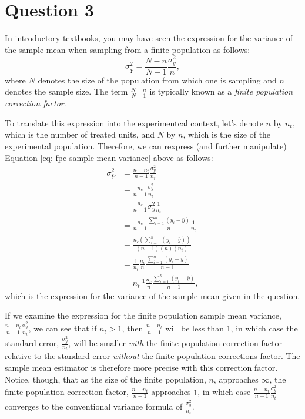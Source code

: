 \documentclass[
  12pt,
  leqno]{article}
\begin{document}
\section*{Question 3}

In introductory textbooks, you may have seen the expression for the
variance of the sample mean when sampling from a finite population as
follows: \begin{equation}
\sigma^2_{\overline{Y}} = \frac{N - n}{N - 1} \frac{\sigma^2_y}{n},
\label{eq: fpc sample mean variance}
\end{equation} where \(N\) denotes the size of the population from which
one is sampling and \(n\) denotes the sample size. The term
\(\frac{N - n}{N - 1}\) is typically known as a
\textit{finite population correction factor}.

To translate this expression into the experimentcal context, let's
denote \(n\) by \(n_t\), which is the number of treated units, and \(N\)
by \(n\), which is the size of the experimental population. Therefore,
we can rexpress (and further manipulate) Equation
\ref{eq: fpc sample mean variance} above as follows: \begin{align*}
\sigma^2_{\overline{Y}} & = \frac{n - n_t}{n - 1} \frac{\sigma^2_y}{n_t} \\
& = \frac{n_c}{n - 1} \frac{\sigma^2_y}{n_t} \\
& = \frac{n_c}{n - 1} \sigma^2_y \frac{1}{n_t} \\
& = \frac{n_c}{n - 1} \frac{\sum_{i = 1}^n \left(y_i - \bar{y}\right)}{n} \frac{1}{n_t} \\
& = \frac{n_c \left(\sum_{i = 1}^n \left(y_i - \bar{y}\right)\right)}{\left(n - 1\right)\left(n\right) \left(n_t\right)} \\
& = \frac{1}{n_t} \frac{n_c}{n} \frac{\sum_{i = 1}^n \left(y_i - \bar{y}\right)}{n - 1} \\
& = n_t^{-1} \frac{n_c}{n} \frac{\sum_{i = 1}^n \left(y_i - \bar{y}\right)}{n - 1},
\end{align*} which is the expression for the variance of the sample mean
given in the question.

If we examine the expression for the finite population sample mean
variance, \(\frac{n - n_t}{n - 1} \frac{\sigma^2_y}{n_t}\), we can see
that if \(n_t > 1\), then \(\frac{n - n_t}{n - 1}\) will be less than 1,
in which case the standard error, \(\frac{\sigma^2_y}{n_t}\), will be
smaller \textit{with} the finite population correction factor relative
to the standard error \textit{without} the finite population corrections
factor. The sample mean estimator is therefore more precise with this
correction factor. Notice, though, that as the size of the finite
population, \(n\), approaches \(\infty\), the finite population
correction factor, \(\frac{n - n_t}{n - 1}\) approaches \(1\), in which
case \(\frac{n - n_t}{n - 1} \frac{\sigma^2_y}{n_t}\) converges to the
conventional variance formula of \(\frac{\sigma^2_y}{n_t}\).
\end{document}

